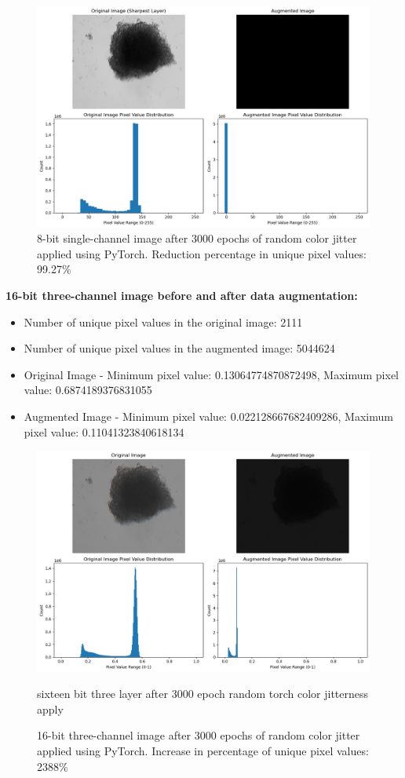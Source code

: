 \documentclass[12pt,twoside,a4paper,parskip]{scrbook} %
\begin{document}
\begin{figure}[H]
  \centering
  \includegraphics[scale=0.5]{figures/8bit_nOne.png} 
  \caption{8-bit single-channel image after 3000 epochs of random color jitter applied using PyTorch. Reduction percentage in unique pixel values: 99.27\%}
  \label{fig:8bit_n one}
\end{figure}

\textbf{16-bit three-channel image before and after data augmentation:}
\begin{itemize}
  \item Number of unique pixel values in the original image: 2111
  \item Number of unique pixel values in the augmented image: 5044624
  \item Original Image - Minimum pixel value: 0.13064774870872498, Maximum pixel value: 0.6874189376831055
  \item Augmented Image - Minimum pixel value: 0.022128667682409286, Maximum pixel value: 0.11041323840618134
\end{itemize}

\begin{figure}[H]
  \centering
  \includegraphics[scale=0.5]{figures/16bit_three_1.png} 
  \caption{sixteen bit three layer after 3000 epoch random torch color jitterness apply}
  \caption{16-bit three-channel image after 3000 epochs of random color jitter applied using PyTorch. Increase in percentage of unique pixel values: 2388\%}
  \label{fig:16bit_three_version1}
\end{figure}
\end{document}

